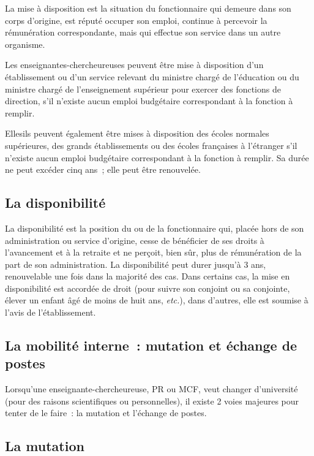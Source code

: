 La mise \`a disposition est la situation du fonctionnaire qui demeure
dans son corps d'origine, est r\'eput\'e occuper son emploi, continue
\`a percevoir la r\'emun\'eration correspondante, mais qui effectue son
service dans un autre organisme.

Les enseignant\mp e\mp s-chercheur\mp euse\mp s peuvent \^etre mis\mp e \`a disposition d'un
\'etablissement ou d'un service relevant du ministre charg\'e de
l'\'education ou du ministre charg\'e de l'enseignement sup\'erieur
pour exercer des fonctions de direction, s'il n'existe aucun emploi
budg\'etaire correspondant \`a la fonction \`a remplir.

Elles\mp ils peuvent \'egalement \^etre mis\mp es \`a disposition des \'ecoles
normales sup\'erieures, des grands \'eta\-blis\-se\-ments ou des
\'ecoles fran\c caises \`a l'\'etranger s'il n'existe aucun emploi
budg\'etaire correspondant \`a la fonction \`a remplir. Sa dur\'ee
ne peut exc\'eder cinq ans~; elle peut \^etre renouvel\'ee.

\subsection*{La disponibilit\'e}

La disponibilit\'e est la position du ou de la fonctionnaire qui, plac\'e\mp e
hors de son administration ou service d'origine, cesse de
b\'en\'eficier de ses droits \`a l'avancement et \`a la retraite et
ne per\c coit, bien s\^ur, plus de r\'emun\'eration de la part de
son administration. La disponibilit\'e peut durer jusqu'\`a 3 ans,
renouvelable une fois dans la majorit\'e des cas. Dans certains cas,
la mise en disponibilit\'e est accord\'ee de droit (pour suivre son
conjoint ou sa conjointe, \'elever un enfant \^ag\'e de moins de huit ans, {\em
etc.}), dans d'autres, elle est soumise \`a l'avis de
l'\'etablissement.


\subsection{La mobilit\'e interne~: mutation et \'echange de postes}

Lorsqu'un\mp e enseignant\mp e-chercheur\mp euse, PR ou MCF, veut changer
d'universit\'e (pour des raisons scientifiques ou personnelles), il
existe 2 voies majeures pour tenter de le faire~: la mutation et
l'\'echange de postes.

\subsection*{La mutation}
\label{mutation}

